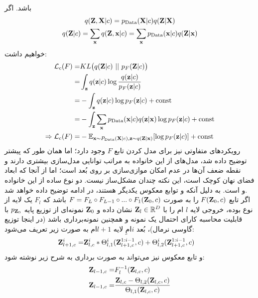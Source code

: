 باشد. اگر
\begin{gather}
	q({\bf Z}, {\bf X}|c) = p_\text{Data}({\bf X}|c) q({\bf Z}|{\bf X})
	\\
	q({\bf Z}|c) = \sum_{\bf x} q({\bf Z}, {\bf x}|c)
    = \sum_{\bf x} p_\text{Data}({\bf x}|c) q({\bf Z}|{\bf x})
\end{gather}
خواهیم داشت:
\begin{align}
	\mathcal{L}_c (F) = & KL\big(q({\bf Z}|c) ~ || ~ p_F({\bf Z}|c)\big) \nonumber                                          \\
	=                   & \int_{\bf z} q({\bf z}|c) \log \frac{q({\bf z}|c)}{p_F({\bf z}|c) \nonumber}                                  \\
	=                   & -\int_{\bf z} q({\bf z}|c) \log p_F({\bf z}|c) + \text{const} \nonumber                                 \\
	=                   & -\int_{\bf z} \sum_{\bf x} p_\text{Data}({\bf x}|c) q({\bf z}|{\bf x}) \log p_F({\bf z}|c) + \text{const} \nonumber       \\
	\Rightarrow
	\mathcal{L}_c (F) = & - \mathbb E_{{\bf x} \sim P_\text{Data}({\bf X}|c), {\bf z} \sim q({\bf Z}|{\bf x})} [\log p_F({\bf z}|c)] + \text{const}
\end{align}
رویکرد‌های متفاوتی نیز برای مدل کردن تابع $F$ وجود دارد؛ اما  همان طور که پیشتر توضیح داده شد، مدل‌های \autoregressive{} از این خانواده به مراتب توانایی مدل‌سازی بیشتری دارند و نقطه ضعف آن‌ها در عدم امکان موازی‌سازی بر روی بُعد است؛ اما از آنجا که ابعاد فضای نهان کوچک است، این نکته چندان مشکل‌ساز نیست. دو نوع ساده از این خانواده  و   است. به دلیل آنکه  و  توابع معکوس یکدیگر هستند،  در ادامه توضیح داده خواهد شد.
\\
اگر تابع $F({\bf Z}_0, c)$ را به صورت
 $F = F_L \circ F_{L-1} \circ ... \circ F_1 ({\bf Z}_0, c)$
 باشد که $F_l$ یک لایه از نوع  بوده، خروجی لایه $l$ ام را با ${\bf Z}_l \in {\mathbb{R}}^D$ نشان داده و ${\bf Z}_0$ نمونه‌ای از توزیع پایه  $p_{{\bf Z}_0}$ با قابلیت محاسبه کارای احتمال یک نمونه و همچنین نمونه‌برداری باشد (در اینجا توزیع گاوسی نرمال)، بُعد $i$امِ لایه $l+1$ام به صورت زیر تعریف می‌شود:
\begin{align}
	{\bf Z}^i_{l+1, c} = & {\bf Z}^i_{l, c} * \Theta^{i}_{l,1}({\bf Z}^{1:i-1}_{l+1, c}, c) + \Theta^{i}_{l,2}({\bf Z}^{1:i-1}_{l+1, c}, c)
\end{align}
و تابع معکوس نیز می‌تواند به صورت برداری به شرح زیر نوشته شود:
\begin{align}
	{\bf Z}_{l-1, c} =  & F_{l}^{-1}({\bf Z}_{l,c},c) \nonumber
	\\
	{\bf  Z}_{l-1, c} = &
	\frac{{\bf  Z}_{l,c} - \Theta_{l,2}({\bf Z}_{l,c}, c)}
	{\Theta_{l,1}({\bf Z}_{l, c}, c)}
\end{align}
